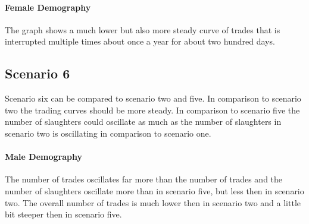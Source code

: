 \paragraph{Female Demography}
The graph shows a much lower but also more steady curve of trades that is interrupted multiple times about once a year for about two hundred days.


\subsection{Scenario 6}
Scenario six can be compared to scenario two and five. In comparison to scenario two the trading curves should be more steady. In comparison to scenario five the number of slaughters could oscillate as much as the number of slaughters in scenario two is oscillating in comparison to scenario one.
\paragraph{Male Demography}
The number of trades oscillates far more than the number of trades and the number of slaughters oscillate more than in scenario five, but less then in scenario two. The overall number of trades is much lower then in scenario two and a little bit steeper then in scenario five. 
